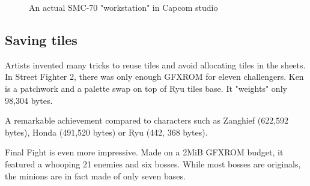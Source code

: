  \begin{figure}[H]
\caption*{An actual SMC-70 "workstation" in Capcom studio}
\end{figure}









\subsection{Saving tiles}
Artists invented many tricks to reuse tiles and avoid allocating tiles in the sheets. In Street Fighter 2, there was only enough GFXROM for eleven challengers. Ken is a patchwork and a palette swap on top of Ryu tiles base. It "weights" only 98,304 bytes.

A remarkable achievement compared to characters such as Zanghief (622,592 bytes), Honda (491,520 bytes) or Ryu (442, 368 bytes). 

\begin{minipage}[t]{0.19\linewidth}
\end{minipage}%
\hfill%
\begin{minipage}[t]{0.19\linewidth}
\end{minipage}
\hfill%
\begin{minipage}[t]{0.19\linewidth}
\end{minipage}%
\hfill%
\begin{minipage}[t]{0.19\linewidth}
\end{minipage}
\hfill%
\begin{minipage}[t]{0.19\linewidth}
\end{minipage}

Final Fight is even more impressive. Made on a 2MiB GFXROM budget, it featured a whooping 21 enemies and six bosses. While most bosses are originals, the minions are in fact made of only seven bases.



